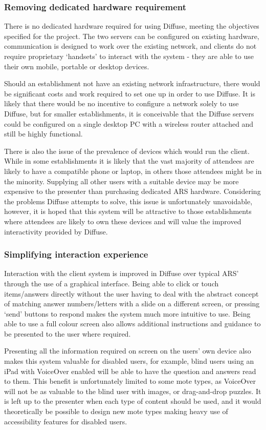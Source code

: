 \documentclass[a4papert,11pt,notitlepage]{article}
\begin{document}
\subsubsection{Removing dedicated hardware requirement}
There is no dedicated hardware required for using Diffuse, meeting the objectives specified for the project. The two servers can be configured on existing hardware, communication is designed to work over the existing network, and clients do not require proprietary `handsets' to interact with the system - they are able to use their own mobile, portable or desktop devices.

Should an establishment not have an existing network infrastructure, there would be significant costs and work required to set one up in order to use Diffuse. It is likely that there would be no incentive to configure a network solely to use Diffuse, but for smaller establishments, it is conceivable that the Diffuse servers could be configured on a single desktop PC with a wireless router attached and still be highly functional.

There is also the issue of the prevalence of devices which would run the client. While in some establishments it is likely that the vast majority of attendees are likely to have a compatible phone or laptop, in others those attendees might be in the minority. Supplying all other users with a suitable device may be more expensive to the presenter than purchasing dedicated ARS hardware. Considering the problems Diffuse attempts to solve, this issue is unfortunately unavoidable, however, it is hoped that this system will be attractive to those establishments where attendees are likely to own these devices and will value the improved interactivity provided by Diffuse.

\subsubsection{Simplifying interaction experience}
Interaction with the client system is improved in Diffuse over typical ARS' through the use of a graphical interface. Being able to click or touch items/answers directly without the user having to deal with the abstract concept of matching answer numbers/letters with a slide on a different screen, or pressing `send' buttons to respond makes the system much more intuitive to use. Being able to use a full colour screen also allows additional instructions and guidance to be presented to the user where required.

Presenting all the information required on screen on the users' own device also makes this system valuable for disabled users, for example, blind users using an iPad with VoiceOver enabled will be able to have the question and answers read to them. This benefit is unfortunately limited to some mote types, as VoiceOver will not be as valuable to the blind user with images, or drag-and-drop puzzles. It is left up to the presenter when each type of content should be used, and it would theoretically be possible to design new mote types making heavy use of accessibility features for disabled users.
\end{document}
